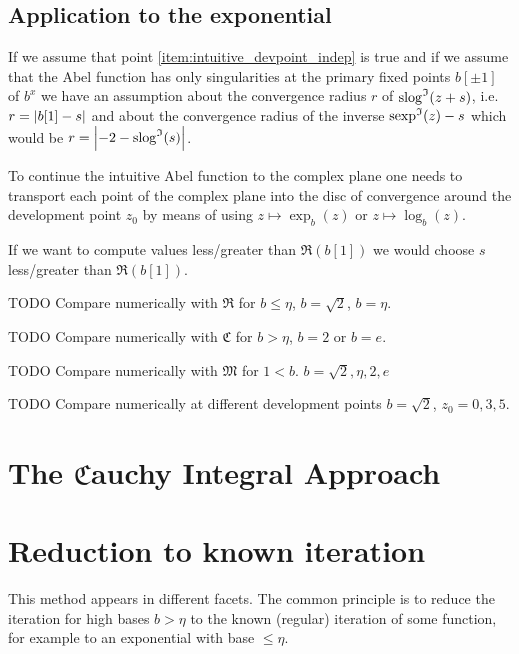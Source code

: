 \documentclass{article}
\numberwithin{equation}{section}
\begin{document}
\subsection{Application to the exponential}

If we assume that point \ref{item:intuitive_devpoint_indep} is true and if
we assume that the Abel function has only singularities at the primary
fixed points $b[\pm 1]$ of $b^x$ we have an assumption about the
convergence radius $r$ of $\operatorname{slog}^{\mathfrak{I}}(z+s)$, i.e.\ $r=\left|b[1]-s\right|$ and about
the convergence radius of the inverse $\operatorname{sexp}^{\mathfrak{I}}(z)-s$ which would be
$r=\left|-2-\operatorname{slog}^{\mathfrak{I}}(s)\right|$.

To continue the intuitive Abel function to the complex plane one needs
to transport each point of the complex plane into the disc of
convergence around the development point $z_0$ by means of using
$z\mapsto \exp_b(z)$ or $z\mapsto \log_b(z)$.

If we want to compute values less/greater than $\Re(b[1])$ we would choose
$s$ less/greater than $\Re(b[1])$.

TODO Compare numerically with $\mathfrak{R}$ for $b\le\eta$,
$b=\sqrt{2}$, $b=\eta$.
 
TODO Compare numerically with $\mathfrak{C}$ for $b>\eta$, $b=2$ or
$b=e$.

TODO Compare numerically with $\mathfrak{M}$ for
$1<b$. $b=\sqrt{2},\eta,2,e$

TODO Compare numerically at different development points $b=\sqrt{2}$,
$z_0=0,3,5$.


\section{The $\mathfrak{C}$auchy Integral Approach}
\label{sec:Cauchy integral}


\section{Reduction to known iteration}\label{sec:Change of base}
This method appears in different facets. The common principle is to
reduce the iteration for high bases $b>\eta$ to the known (regular) iteration of
some function, for example to an exponential with base $\le \eta$.
\end{document}
